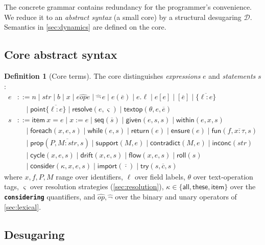 \documentclass[11pt,a4paper]{article}
\theoremstyle{plain}
\theoremstyle{definition}
\newtheorem{definition}[theorem]{Definition}
\theoremstyle{remark}
\newcommand{\tm}[1]{\textbf{\texttt{#1}}}                 %
\newcommand{\Strat}{\varsigma}
\begin{document}
The concrete grammar contains redundancy for the programmer's convenience. We
reduce it to an \emph{abstract syntax} (a small core) by a structural
desugaring $\mathcal{D}$. Semantics in \cref{sec:dynamics} are defined on the
core.

\subsection{Core abstract syntax}

\begin{definition}[Core terms]
\label{def:core}
The core distinguishes \emph{expressions} $e$ and \emph{statements} $s$:
\begin{align*}
e &::= n \mid str \mid b \mid x \mid e \mathbin{\widehat{op}} e \mid
       \widehat{\neg}\, e \mid e(\overline{e}) \mid e.\ell \mid e[e]
       \mid [\overline{e}] \mid \{\overline{\ell : e}\}\\
  &\quad\mid \mathsf{point}\{\overline{\ell:e}\}
       \mid \mathsf{resolve}(e, \Strat) \mid \mathsf{textop}(\theta, e,
       \overline{e})\\[3pt]
s &::= \mathsf{item}\ x = e \mid x := e \mid \mathsf{seq}(\overline{s})
       \mid \mathsf{given}(e, s, s) \mid \mathsf{within}(e, x, s)\\
  &\quad\mid \mathsf{foreach}(x, e, s) \mid \mathsf{while}(e, s)
       \mid \mathsf{return}(e) \mid \mathsf{ensure}(e) \mid \mathsf{fun}(f,
       \overline{x{:}\tau}, s)\\
  &\quad\mid \mathsf{prop}(P, \overline{M{:}str}, s)
       \mid \mathsf{support}(M, e) \mid \mathsf{contradict}(M, e)
       \mid \mathsf{inconc}(str)\\
  &\quad\mid \mathsf{cycle}(x, e, s) \mid \mathsf{drift}(x, e, s)
       \mid \mathsf{flow}(x, e, s) \mid \mathsf{roll}(s)\\
  &\quad\mid \mathsf{consider}(\kappa, x, e, s)
       \mid \mathsf{import}(\overline{\cdot}) \mid \mathsf{try}(s,
       \overline{c}, s)
\end{align*}
where $x,f,P,M$ range over identifiers, $\ell$ over field labels, $\theta$ over
text-operation tags, $\Strat$ over resolution strategies (\cref{sec:resolution}),
$\kappa\in\{\mathsf{all},\mathsf{these},\mathsf{item}\}$ over the
\tm{considering} quantifiers, and $\widehat{op},\widehat{\neg}$ over the binary
and unary operators of \cref{sec:lexical}.
\end{definition}

\subsection{Desugaring}
\end{document}
